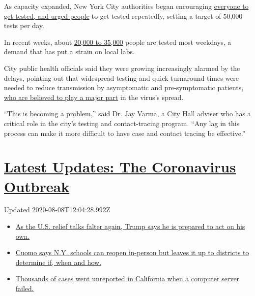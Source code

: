 As capacity expanded, New York City authorities began encouraging
\href{https://www.nychealthandhospitals.org/covid-19-testing-sites/}{everyone
to get tested, and urged people} to get tested repeatedly, setting a
target of 50,000 tests per day.

In recent weeks, about
\href{https://www1.nyc.gov/site/doh/covid/covid-19-data.page}{20,000 to
35,000} people are tested most weekdays, a demand that has put a strain
on local labs.

City public health officials said they were growing increasingly alarmed
by the delays, pointing out that widespread testing and quick turnaround
times were needed to reduce transmission by asymptomatic and
pre-symptomatic patients,
\href{https://www.nytimes.com/2020/06/27/world/europe/coronavirus-spread-asymptomatic.html}{who
are believed to play a major part} in the virus's spread.

``This is becoming a problem,'' said Dr. Jay Varma, a City Hall adviser
who has a critical role in the city's testing and contact-tracing
program. ``Any lag in this process can make it more difficult to have
case and contact tracing be effective.''

\hypertarget{latest-updates-the-coronavirus-outbreak}{%
\section{\texorpdfstring{\href{https://www.nytimes.com/2020/08/07/world/covid-19-news.html?action=click\&pgtype=Article\&state=default\&region=MAIN_CONTENT_1\&context=storylines_live_updates}{Latest
Updates: The Coronavirus
Outbreak}}{Latest Updates: The Coronavirus Outbreak}}\label{latest-updates-the-coronavirus-outbreak}}

Updated 2020-08-08T12:04:28.992Z

\begin{itemize}
\tightlist
\item
  \href{https://www.nytimes.com/2020/08/07/world/covid-19-news.html?action=click\&pgtype=Article\&state=default\&region=MAIN_CONTENT_1\&context=storylines_live_updates\#link-1f86d03a}{As
  the U.S. relief talks falter again, Trump says he is prepared to act
  on his own.}
\item
  \href{https://www.nytimes.com/2020/08/07/world/covid-19-news.html?action=click\&pgtype=Article\&state=default\&region=MAIN_CONTENT_1\&context=storylines_live_updates\#link-3f64a70a}{Cuomo
  says N.Y. schools can reopen in-person but leaves it up to districts
  to determine if, when and how.}
\item
  \href{https://www.nytimes.com/2020/08/07/world/covid-19-news.html?action=click\&pgtype=Article\&state=default\&region=MAIN_CONTENT_1\&context=storylines_live_updates\#link-14e70066}{Thousands
  of cases went unreported in California when a computer server failed.}
\end{itemize}

